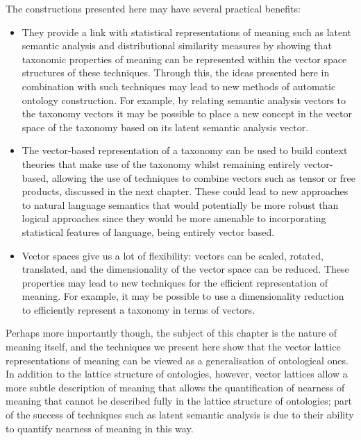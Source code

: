 The constructions presented here may have several practical benefits:
\begin{itemize}
\item  They provide a link with statistical representations of meaning such as latent semantic analysis and distributional similarity measures by showing that taxonomic properties of meaning can be represented within the vector space structures of these techniques. Through this, the ideas presented here in combination with such techniques may lead to new methods of automatic ontology construction. For example, by relating semantic analysis vectors to the taxonomy vectors it may be possible to place a new concept in the vector space of the taxonomy based on its latent semantic analysis vector.
\item The vector-based representation of a taxonomy can be used to build context theories that make use of the taxonomy whilst remaining entirely vector-based, allowing the use of techniques to combine vectors such as tensor or free products, discussed in the next chapter. These could lead to new approaches to natural language semantics that would potentially be more robust than logical approaches since they would be more amenable to incorporating statistical features of language, being entirely vector based.
\item Vector spaces give us a lot of flexibility: vectors can be scaled, rotated, translated, and the dimensionality of the vector space can be reduced. These properties may lead to new techniques for the efficient representation of meaning. For example, it may be possible to use a dimensionality reduction to efficiently represent a taxonomy in terms of vectors.
\end{itemize}
Perhaps more importantly though, the subject of this chapter is the nature of meaning itself, and the techniques we present here show that the vector lattice representations of meaning can be viewed as a generalisation of ontological ones. In addition to the lattice structure of ontologies, however, vector lattices allow a more subtle description of meaning that allows the quantification of nearness of meaning that cannot be described fully in the lattice structure of ontologies; part of the success of techniques such as latent semantic analysis is due to their ability to quantify nearness of meaning in this way. 

